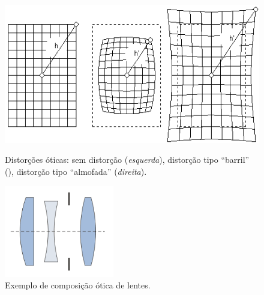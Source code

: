 \begin{figure}[ht]
	\centering
	\hspace{0.1cm}
	\begin{minipage}[b]{0.45\linewidth}
	    \centering
	    \includegraphics[width=\textwidth]{images/distortions.png}
	 	\caption{Distorções óticas: sem distorção (\textit{esquerda}), 
	 	distorção tipo “barril” (), 
	 	distorção tipo “almofada” (\textit{direita}).}
	 	\label{fig:distortions}
	\end{minipage}
	\hspace{0.1cm}
	\begin{minipage}[b]{0.45\linewidth}
		\centering
	    \includegraphics[width=\textwidth,height=4cm]{images/lens.png}
	 	\caption{Exemplo de composição ótica de lentes.}
	 	\label{fig:lens}
	\end{minipage}
\end{figure}


